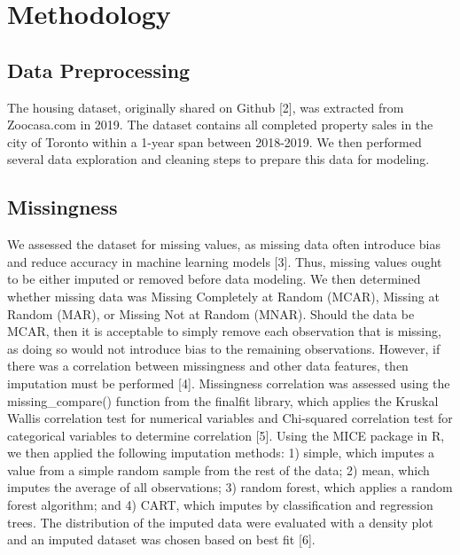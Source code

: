 \documentclass[11pt,]{article}
\begin{document}
\hypertarget{methodology}{%
\section{Methodology}\label{methodology}}

\hypertarget{data-preprocessing}{%
\subsection{Data Preprocessing}\label{data-preprocessing}}

The housing dataset, originally shared on Github {[}2{]}, was extracted
from Zoocasa.com in 2019. The dataset contains all completed property
sales in the city of Toronto within a 1-year span between 2018-2019. We
then performed several data exploration and cleaning steps to prepare
this data for modeling.

\hypertarget{missingness}{%
\subsection{Missingness}\label{missingness}}

We assessed the dataset for missing values, as missing data often
introduce bias and reduce accuracy in machine learning models {[}3{]}.
Thus, missing values ought to be either imputed or removed before data
modeling. We then determined whether missing data was Missing Completely
at Random (MCAR), Missing at Random (MAR), or Missing Not at Random
(MNAR). Should the data be MCAR, then it is acceptable to simply remove
each observation that is missing, as doing so would not introduce bias
to the remaining observations. However, if there was a correlation
between missingness and other data features, then imputation must be
performed {[}4{]}. Missingness correlation was assessed using the
missing\_compare() function from the finalfit library, which applies the
Kruskal Wallis correlation test for numerical variables and Chi-squared
correlation test for categorical variables to determine correlation
{[}5{]}. Using the MICE package in R, we then applied the following
imputation methods: 1) simple, which imputes a value from a simple
random sample from the rest of the data; 2) mean, which imputes the
average of all observations; 3) random forest, which applies a random
forest algorithm; and 4) CART, which imputes by classification and
regression trees. The distribution of the imputed data were evaluated
with a density plot and an imputed dataset was chosen based on best fit
{[}6{]}.
\end{document}
